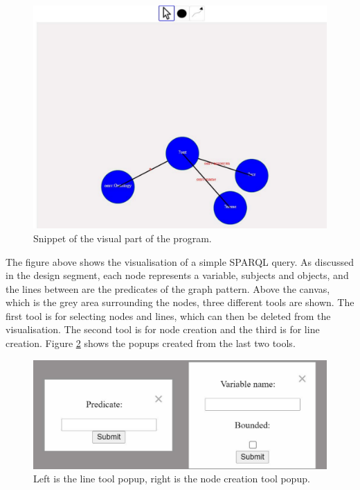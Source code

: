 \begin{figure}[H]
    \centering
    \includegraphics[width=1\linewidth]{figures/visual-ui-first.pdf}
    \caption{Snippet of the visual part of the program.}
    \label{fig:visual-ui-first}
\end{figure}
The figure above shows the visualisation of a simple SPARQL query. As discussed in the design segment, each node represents a variable, subjects and objects, and the lines between are the predicates of the graph pattern. Above the canvas, which is the grey area surrounding the nodes, three different tools are shown. The first tool is for selecting nodes and lines, which can then be deleted from the visualisation. The second tool is for node creation and the third is for line creation. Figure \ref{fig:visual-arrow-node} shows the popups created from the last two tools.

\begin{figure}[H]
    \centering
    \includegraphics[width=1\linewidth]{figures/visual-arrow-node.pdf}
    \caption{Left is the line tool popup, right is the node creation tool popup.}
    \label{fig:visual-arrow-node}
\end{figure}

